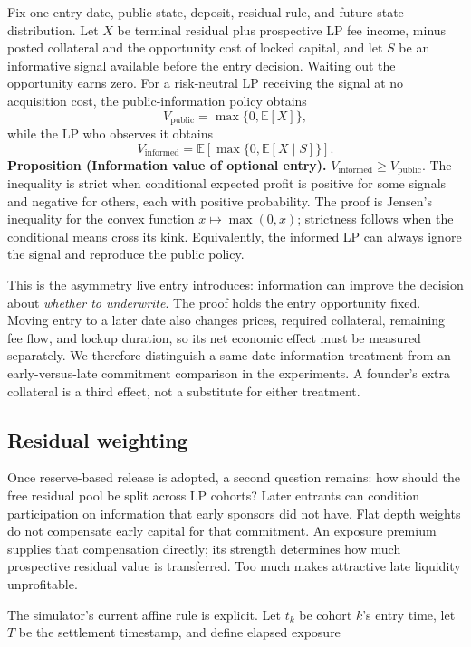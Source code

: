 \documentclass[10pt]{article}
\begin{document}
Fix one entry date, public state, deposit, residual rule, and future-state distribution. Let $X$ be terminal residual plus prospective LP fee income, minus posted collateral and the opportunity cost of locked capital, and let $S$ be an informative signal available before the entry decision. Waiting out the opportunity earns zero. For a risk-neutral LP receiving the signal at no acquisition cost, the public-information policy obtains
\[
V_{\mathrm{public}}=\max\{0,\mathbb E[X]\},
\]
while the LP who observes it obtains
\[
V_{\mathrm{informed}}=\mathbb E\!\left[\max\{0,\mathbb E[X\mid S]\}\right].
\]
\textbf{Proposition (Information value of optional entry).}
$V_{\mathrm{informed}}\ge V_{\mathrm{public}}$. The inequality is strict when conditional expected profit is positive for some signals and negative for others, each with positive probability. The proof is Jensen's inequality for the convex function $x\mapsto\max(0,x)$; strictness follows when the conditional means cross its kink. Equivalently, the informed LP can always ignore the signal and reproduce the public policy.

This is the asymmetry live entry introduces: information can improve the decision about \emph{whether to underwrite}. The proof holds the entry opportunity fixed. Moving entry to a later date also changes prices, required collateral, remaining fee flow, and lockup duration, so its net economic effect must be measured separately. We therefore distinguish a same-date information treatment from an early-versus-late commitment comparison in the experiments. A founder's extra collateral is a third effect, not a substitute for either treatment.

\subsection{Residual weighting}

Once reserve-based release is adopted, a second question remains: how should the free residual pool be split across LP cohorts? Later entrants can condition participation on information that early sponsors did not have. Flat depth weights do not compensate early capital for that commitment. An exposure premium supplies that compensation directly; its strength determines how much prospective residual value is transferred. Too much makes attractive late liquidity unprofitable.

The simulator's current affine rule is explicit. Let $t_k$ be cohort $k$'s entry time, let $T$ be the settlement timestamp, and define elapsed exposure
\end{document}
